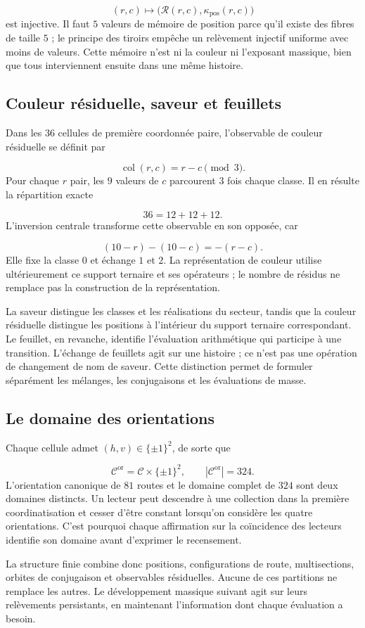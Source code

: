 \[
 (r,c)\longmapsto\bigl(\mathcal R(r,c),\kappa_{\mathrm{pos}}(r,c)\bigr)
\]
est injective. Il faut \(5\) valeurs de mémoire de position parce qu’il
existe des fibres de taille \(5\) ; le principe des tiroirs empêche un
relèvement injectif uniforme avec moins de valeurs. Cette mémoire n’est ni la couleur
ni l’exposant massique, bien que tous interviennent ensuite dans une même histoire.


\subsection{Couleur résiduelle, saveur et feuillets
}

Dans les \(36\) cellules de première coordonnée paire, l’observable de couleur
résiduelle se définit par

\[
 \operatorname{col}(r,c)=r-c\pmod3.
\]
Pour chaque \(r\) pair, les \(9\) valeurs de \(c\) parcourent \(3\)
fois chaque classe. Il en résulte la répartition exacte

\[
 36=12+12+12.
\]
L’inversion centrale transforme cette observable en son opposée, car

\[
 (10-r)-(10-c)=-(r-c).
\]
Elle fixe la classe \(0\) et échange \(1\) et \(2\). La représentation
de couleur utilise ultérieurement ce support ternaire et ses opérateurs ;
le nombre de résidus ne remplace pas la construction de la représentation.


La saveur distingue les classes et les réalisations du secteur, tandis que la couleur
résiduelle distingue les positions à l’intérieur du support ternaire correspondant.
Le feuillet, en revanche, identifie l’évaluation arithmétique qui participe à
une transition. L’échange de feuillets agit sur une histoire ; ce n’est pas
une opération de changement de nom de saveur. Cette distinction permet de
formuler séparément les mélanges, les conjugaisons et les évaluations
de masse.


\subsection{Le domaine des orientations
}

Chaque cellule admet \((h,v)\in\{\pm1\}^2\), de sorte que

\[
 \mathcal C^{\mathrm{or}}=\mathcal C\times\{\pm1\}^2,
 \qquad |\mathcal C^{\mathrm{or}}|=324.
\]
L’orientation canonique de \(81\) routes et le domaine complet de \(324\)
sont deux domaines distincts. Un lecteur peut descendre à une collection dans la
première coordinatisation et cesser d’être constant lorsqu’on considère les quatre
orientations. C’est pourquoi chaque affirmation sur la coïncidence des lecteurs
identifie son domaine avant d’exprimer le recensement.


La structure finie combine donc positions, configurations de route,
multisections, orbites de conjugaison et observables résiduelles. Aucune
de ces partitions ne remplace les autres. Le développement massique suivant
agit sur leurs relèvements persistants, en maintenant l’information dont
chaque évaluation a besoin.

